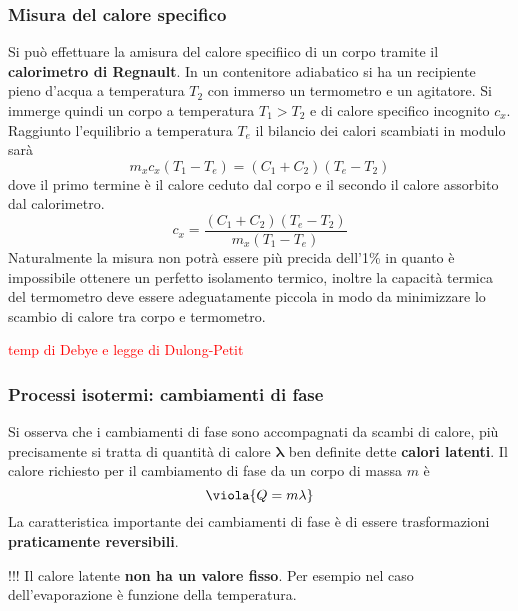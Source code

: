 \subsubsection{Misura del calore specifico}
Si può effettuare la amisura del calore specifiico di un corpo tramite il \textbf{calorimetro di Regnault}. In un contenitore adiabatico si ha un recipiente pieno d'acqua a temperatura \(T_2\) con immerso un termometro e un agitatore. Si immerge quindi un corpo a temperatura \(T_1 > T_2\) e di calore specifico incognito \(c_x\). Raggiunto l'equilibrio a temperatura \(T_e\) il bilancio dei calori scambiati in modulo sarà
\[ 
m_xc_x(T_1 - T_e) = (C_1 + C_2)(T_e - T_2)
\]
dove il primo termine è il calore ceduto dal corpo e il secondo il calore assorbito dal calorimetro.
\[ 
c_x = \frac{(C_1 + C_2)(T_e - T_2)}{m_x(T_1 - T_e)}
\]
Naturalmente la misura non potrà essere più precida dell'1\% in quanto è impossibile ottenere un perfetto isolamento termico, inoltre la capacità termica del termometro deve essere adeguatamente piccola  in modo da minimizzare lo scambio di calore tra corpo e termometro.


\begin{center}
	\textcolor{red}{temp di Debye e legge di Dulong-Petit}
\end{center}

\subsubsection{Processi isotermi: cambiamenti di fase}
Si osserva che i cambiamenti di fase sono accompagnati da scambi di calore, più precisamente si tratta di quantità di calore \(\boldsymbol{\lambda}\) ben definite dette  \textbf{calori latenti}. Il calore richiesto per il cambiamento di fase da un corpo di massa \(m\) è 
\begin{equation}\label{calorelatente}
	\viola{	Q = m\lambda}
\end{equation}
La caratteristica importante dei cambiamenti di fase è di essere trasformazioni \textbf{praticamente reversibili}.

\begin{center}
	\colorbox{attenzione}{\begin{minipage}{5.75in}
			\begin{attenzione}{!!!}
				Il calore latente \textbf{non ha un valore fisso}. Per esempio nel caso dell'evaporazione è funzione della temperatura.
			\end{attenzione}
	\end{minipage}}
\end{center}


